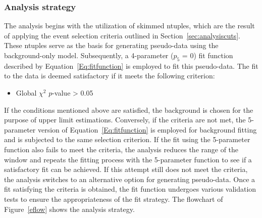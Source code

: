 
\subsubsection{Analysis strategy}

The analysis begins with the utilization of skimmed ntuples, which are the result of applying the event selection criteria outlined in Section~\ref{sec:analysiscuts}. These ntuples serve as the basis for generating pseudo-data using the background-only model. Subsequently, a 4-parameter ($p_5$ = 0) fit function described by Equation~\ref{Eq:fitfunction} is employed to fit this pseudo-data. The fit to the data is deemed satisfactory if it meets the following criterion:

\begin{itemize}
	\item Global $\chi^2$ $p$-value > 0.05
\end{itemize}

If the conditions mentioned above are satisfied, the background is chosen for the purpose of upper limit estimations. Conversely, if the criteria are not met, the 5-parameter version of Equation~\ref{Eq:fitfunction} is employed for background fitting and is subjected to the same selection criterion. If the fit using the 5-parameter function also fails to meet the criteria, the analysis reduces the range of the window and repeats the fitting process with the 5-parameter function to see if a satisfactory fit can be achieved. If this attempt still does not meet the criteria, the analysis switches to an alternative option for generating pseudo-data. Once a fit satisfying the criteria is obtained, the fit function undergoes various validation tests to ensure the appropriateness of the fit strategy. The flowchart of Figure~\ref{eflow} shows the analysis strategy.

